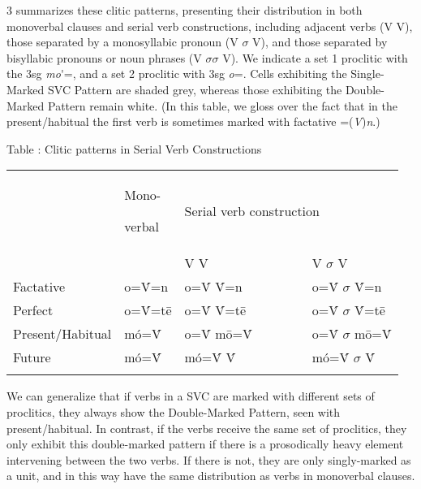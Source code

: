 3 summarizes these clitic patterns, presenting their distribution in both monoverbal clauses and serial verb constructions, including adjacent verbs (V V), those separated by a monosyllabic pronoun (V $\sigma $ V), and those separated by bisyllabic pronouns or noun phrases (V $\sigma \sigma $ V). We indicate a set 1 proclitic with the 3sg \textit{mo}\'{ }=, and a set 2 proclitic with 3sg \textit{o}=. Cells exhibiting the Single-Marked SVC Pattern are shaded grey, whereas those exhibiting the Double-Marked Pattern remain white. (In this table, we gloss over the fact that in the present/habitual the first verb is sometimes marked with factative =(\textit{V})\textit{n}.)

\begin{stylelsTableHeading}
\label{bkm:Ref448125394}Table : Clitic patterns in Serial Verb Constructions
\end{stylelsTableHeading}

\begin{tabularx}{\textwidth}{XXXXX}
\lsptoprule
\hhline{----~} & {\mdseries Mono-}

{\mdseries verbal} & \multicolumn{2}{X}{{\mdseries Serial verb construction}

} & \\
\hhline{--~~~} &  & {\mdseries V V} & \multicolumn{2}{X}{{\mdseries V $\sigma $ V}

}\\
{\mdseries Factative} & {\mdseries o=\'{V}=n} & {\mdseries o=\'{V} \'{V}=n} & \multicolumn{2}{X}{{\mdseries o=\'{V} $\sigma $ \'{V}=n}

}\\
{\mdseries Perfect} & {\mdseries o=\'{V}=t\={e}} & {\mdseries o=\'{V} \'{V}=t\={e}} & \multicolumn{2}{X}{{\mdseries o=\'{V} $\sigma $ \'{V}=t\={e}}

}\\
{\mdseries Present/Habitual} & {\mdseries mó=\'{V}} & {\mdseries o=\'{V} m\={o}=\'{V}} & \multicolumn{2}{X}{{\mdseries o=\'{V} $\sigma $ m\={o}=\'{V}}

}\\
{\mdseries Future} & {\mdseries mó=\'{V}} & {\mdseries mó=\'{V} \'{V}} & \multicolumn{2}{X}{{\mdseries mó=\'{V} $\sigma $ \'{V}}

}\\
\lspbottomrule
\end{tabularx}
We can generalize that if verbs in a SVC are marked with different sets of proclitics, they always show the Double-Marked Pattern, seen with present/habitual. In contrast, if the verbs receive the same set of proclitics, they only exhibit this double-marked pattern if there is a prosodically heavy element intervening between the two verbs. If there is not, they are only singly-marked as a unit, and in this way have the same distribution as verbs in monoverbal clauses. 

